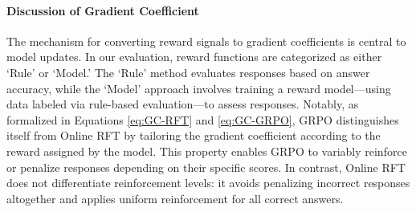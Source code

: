 \paragraph{Discussion of Gradient Coefficient} The mechanism for converting reward signals to gradient coefficients is central to model updates. In our evaluation, reward functions are categorized as either `Rule' or `Model.' The `Rule' method evaluates responses based on answer accuracy, while the `Model' approach involves training a reward model—using data labeled via rule-based evaluation—to assess responses. Notably, as formalized in Equations \ref{eq:GC-RFT} and \ref{eq:GC-GRPO}, GRPO distinguishes itself from Online RFT by tailoring the gradient coefficient according to the reward assigned by the model. This property enables GRPO to variably reinforce or penalize responses depending on their specific scores. In contrast, Online RFT does not differentiate reinforcement levels: it avoids penalizing incorrect responses altogether and applies uniform reinforcement for all correct answers.

